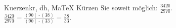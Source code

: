\begin{MAufgabe}{Kuerzen}{kr, dh, MaTeX}
K\"urzen Sie soweit m\"oglich: $\frac{3420}{2970}$.\\ 
\ifLsg\MLoesung
\quad $\frac{3420}{2970}=\frac{(90)\cdot(38)}{(90)\cdot(33)}=\frac{38}{33}$.\else\relax\fi
 \end{MAufgabe}